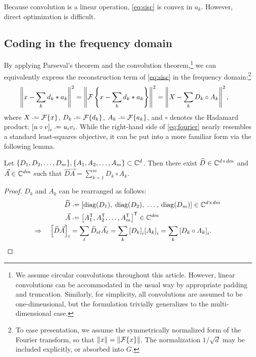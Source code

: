 \documentclass{article} %
\begin{document}
Because convolution is a linear operation, \eqref{eq:sisc} is convex in $a_k$.  
However, direct optimization is difficult.

\subsection{Coding in the frequency domain}
By applying Parseval's theorem and the convolution theorem,\footnote{We assume circular
convolutions throughout this article. However, linear convolutions can be accommodated
in the usual way by appropriate padding and truncation. Similarly, for simplicity, all 
convolutions are assumed to be one-dimensional, but the formulation trivially
generalizes to the multi-dimensional case.} we can equivalently express the 
reconstruction term of \eqref{eq:sisc} in the frequency domain:\footnote{To ease
presentation, we assume the symmetrically normalized form of the Fourier transform, 
so that $\|x\| = \|\mathcal{F}\{x\}\|$. The normalization $1/\sqrt{d}$ may be included
explicitly, or absorbed into $G$.}
\begin{align}
\left\|x - \sum_k d_k * a_k\right\|^2 &= \left\|\mathcal{F}\left\{x - \sum_k d_k *
a_k\right\}\right\|^2
= \left\| X - \sum_k D_k \circ A_k\right\|^2,\label{eq:fourier}
\end{align}
where $X \defeq \F\{x\}$, $D_k \defeq \F\{d_k\}$, $A_k \defeq \F\{a_k\}$,
and $\circ$ denotes the Hadamard product: ${{[u\circ v]}_i \defeq u_i v_i}$.
While the right-hand side of \eqref{eq:fourier} nearly resembles a standard
least-squares objective, it can be put into a more familiar form via the following
lemma.
\begin{lemma}
Let $\{D_1, D_2, \dots, D_m\}, \{A_1, A_2, \dots, A_m\} \subset \mathbb{C}^d$.  
Then there exist ${\widehat{D} \in \mathbb{C}^{d\times dm}}$ and ${\vec{A} \in \mathbb{C}^{dm}}$ such that 
${\widehat{D}\vec{A} = \sum_{k=1}^m D_k \circ A_k}$.\label{lemma:hadamard}
\end{lemma}
\begin{proof}
$D_k$ and $A_k$ can be rearranged as follows:
\begin{align*}
\widehat{D} &\defeq \left[\diag(D_1),\; \diag(D_2),\; \dots,\; \diag(D_m)\right] \in \C^{d\times dm}\\
\vec{A} &\defeq \left[A_1\trans, A_2\trans, \dots,
A_m\trans\right]\trans \in \C^{dm}\\
\Rightarrow \quad {\left[\widehat{D}\vec{A}\right]}_i &= \sum_\ell \widehat{D}_{i\ell}
\vec{A}_\ell = \sum_k {[D_k]}_i {[A_k]}_i = \sum_k
{[D_k \circ A_k]}_i.
\end{align*}
\end{proof}
\end{document}
